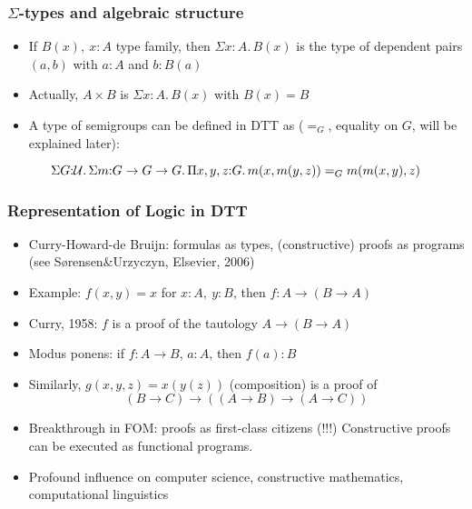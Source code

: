 \documentclass[handout]{beamer}
\newcommand{\depi}[3]{\Pi{#1{:}#2.\,#3}}
\newcommand{\sigm}[3]{\Sigma{#1{:}#2.\,#3}}
\newcommand{\UU}{{\cal U}}
\begin{document}
\frame
  {
  
    \frametitle{$\Sigma$-types and algebraic structure}

    \begin{itemize}[<+->]
    \item If $B(x),~x:A$ type family, then $\sigm{x}{A}{B(x)}$ is the type of dependent
    pairs $(a,b)$  with $a:A$ and $b:B(a)$
    \item Actually, $A\times B$ is $\sigm{x}{A}{B(x)}$ with $B(x)=B$
    \item A type of semigroups can be defined in DTT as ($=_G$,
    equality on $G$, will be explained later):
    \end{itemize}
\[\sigm{G}{\UU}{\sigm{m}{G\to G\to G}{\depi{x,y,z}{G}{m(x,m(y,z)) =_G m(m(x,y),z)}}}\]
  }

  
 
 \frame
  {
  
    \frametitle{Representation of Logic in DTT}

    \begin{itemize}[<+->]
    \item Curry-Howard-de Bruijn: formulas as types, (constructive) proofs as programs 
(see Sørensen\&Urzyczyn, Elsevier, 2006)
    \item Example: $f(x,y)=x$ for $x:A,~y:B$, then $f: A \to (B\to A)$ 
    \item Curry, 1958: $f$ is a proof of the tautology $A \to (B\to A)$
    \item Modus ponens: if $f:A\to B$, $a:A$, then $f(a):B$
    \item Similarly, $g(x,y,z)=x(y(z))$ (composition) is a proof of
     \[(B\to C) \to ((A\to B) \to (A\to C)) \]
    \item Breakthrough in FOM: proofs as first-class citizens (!!!)
 Constructive proofs can be executed as functional programs.
   \item Profound influence on computer science, constructive mathematics, computational
   linguistics
    \end{itemize}
  }
\end{document}
